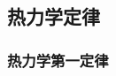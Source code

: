 \documentclass{article}
\begin{document}

\newpage

\subsection{热力学定律}
\subsubsection{热力学第一定律}
\end{document}

